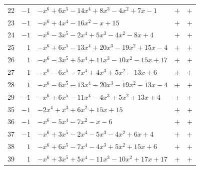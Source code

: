 \documentclass[11pt]{article}
\begin{document}
\begin{longtable}{@{}rrlcc@{}}
22 & $-1$ & $-x^{6}+6x^{5}-14x^{4}+8x^{3}-4x^{2}+7x-1$ & $+$ & $+$\\
23 & $-1$ & $-x^{6}+4x^{4}-16x^{2}-x+15$ & $+$ & $+$\\
24 & $-1$ & $-x^{6}-3x^{5}-2x^{4}+5x^{3}-4x^{2}-8x+4$ & $+$ & $+$\\
25 & $1$ & $-x^{6}+6x^{5}-13x^{4}+20x^{3}-19x^{2}+15x-4$ & $+$ & $+$\\
26 & $1$ & $-x^{6}-3x^{5}+5x^{4}+11x^{3}-10x^{2}-15x+17$ & $+$ & $+$\\
27 & $1$ & $-x^{6}-6x^{5}-7x^{4}+4x^{3}+5x^{2}-13x+6$ & $+$ & $+$\\
28 & $1$ & $-x^{6}-6x^{5}-13x^{4}-20x^{3}-19x^{2}-13x-4$ & $+$ & $+$\\
29 & $-1$ & $-x^{6}+6x^{5}-11x^{4}-4x^{3}+5x^{2}+13x+4$ & $+$ & $+$\\
35 & $-1$ & $-2x^{4}+x^{3}+6x^{2}+15x+15$ & $+$ & $+$\\
36 & $-1$ & $-x^{6}-5x^{4}-7x^{2}-x-6$ & $+$ & $+$\\
37 & $-1$ & $-x^{6}+3x^{5}-2x^{4}-5x^{3}-4x^{2}+6x+4$ & $+$ & $+$\\
38 & $1$ & $-x^{6}+6x^{5}-7x^{4}-4x^{3}+5x^{2}+15x+6$ & $+$ & $+$\\
39 & $1$ & $-x^{6}+3x^{5}+5x^{4}-11x^{3}-10x^{2}+17x+17$ & $+$ & $+$\\
\end{longtable}
\endgroup
\end{document}
